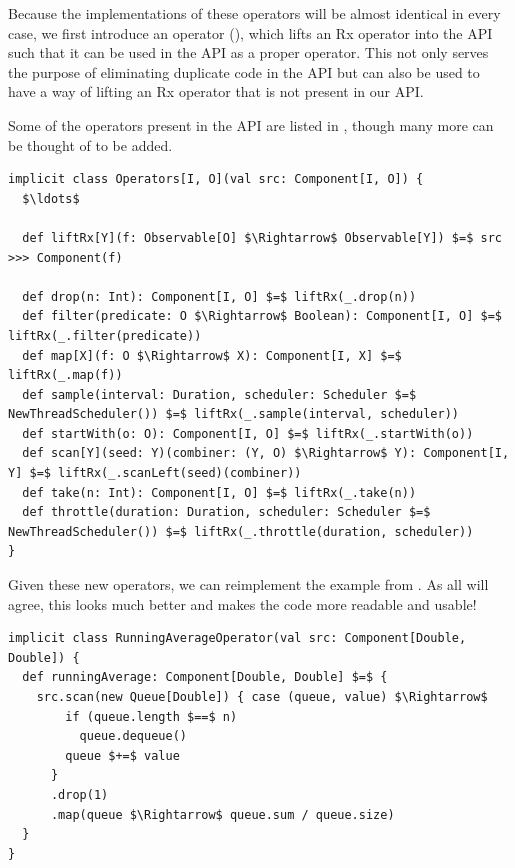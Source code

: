 Because the implementations of these operators will be almost identical in every case, we first introduce an operator  (), which lifts an Rx operator into the \comp API such that it can be used in the API as a proper operator. This not only serves the purpose of eliminating duplicate code in the API but can also be used to have a way of lifting an Rx operator that is not present in our API.

Some of the operators present in the API are listed in , though many more can be thought of to be added.

\begin{minipage}{\linewidth}
\begin{lstlisting}[style=ScalaStyle, caption={Rx style operators}, label={lst:rx-style-operators}]
implicit class Operators[I, O](val src: Component[I, O]) {
  $\ldots$

  def liftRx[Y](f: Observable[O] $\Rightarrow$ Observable[Y]) $=$ src >>> Component(f)
  
  def drop(n: Int): Component[I, O] $=$ liftRx(_.drop(n))
  def filter(predicate: O $\Rightarrow$ Boolean): Component[I, O] $=$ liftRx(_.filter(predicate))
  def map[X](f: O $\Rightarrow$ X): Component[I, X] $=$ liftRx(_.map(f))
  def sample(interval: Duration, scheduler: Scheduler $=$ NewThreadScheduler()) $=$ liftRx(_.sample(interval, scheduler))
  def startWith(o: O): Component[I, O] $=$ liftRx(_.startWith(o))
  def scan[Y](seed: Y)(combiner: (Y, O) $\Rightarrow$ Y): Component[I, Y] $=$ liftRx(_.scanLeft(seed)(combiner))
  def take(n: Int): Component[I, O] $=$ liftRx(_.take(n))
  def throttle(duration: Duration, scheduler: Scheduler $=$ NewThreadScheduler()) $=$ liftRx(_.throttle(duration, scheduler))
}
\end{lstlisting}
\end{minipage}

Given these new operators, we can reimplement the  example from . As all will agree, this looks much better and makes the code more readable and usable!

\begin{minipage}{\linewidth}
\begin{lstlisting}[style=ScalaStyle, caption={Implementation of \code{RunningAverage} using the new Rx style operators}, label={lst:running-average-with-operators}]
implicit class RunningAverageOperator(val src: Component[Double, Double]) {
  def runningAverage: Component[Double, Double] $=$ {
    src.scan(new Queue[Double]) { case (queue, value) $\Rightarrow$
        if (queue.length $==$ n)
          queue.dequeue()
        queue $+=$ value
      }
      .drop(1)
      .map(queue $\Rightarrow$ queue.sum / queue.size)
  }
}
\end{lstlisting}
\end{minipage}

